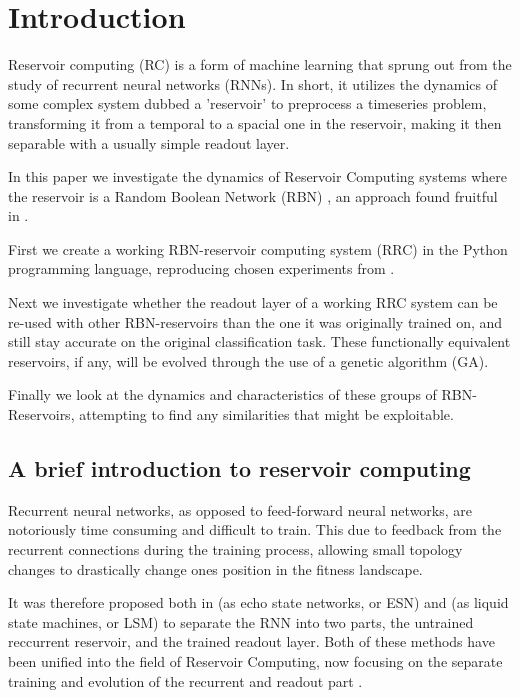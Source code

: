 \section{Introduction}

Reservoir computing (RC) is a form of machine learning that sprung out from the study of recurrent neural networks (RNNs).
In short, it utilizes the dynamics of some complex system dubbed a 'reservoir' to preprocess a timeseries problem,
transforming it from a temporal to a spacial one in the reservoir, making it then separable with a usually simple readout layer.

In this paper we investigate the dynamics of Reservoir Computing systems where the reservoir is a Random Boolean Network (RBN) \cite{gershenson2004introduction},
an approach found fruitful in \cite{rbn-reservoir}.

First we create a working RBN-reservoir computing system (RRC) in the Python programming language,
reproducing chosen experiments from \cite{rbn-reservoir}.

Next we investigate whether the readout layer of a working RRC system can be re-used with other RBN-reservoirs than the one it was originally trained on,
and still stay accurate on the original classification task.
These functionally equivalent reservoirs, if any, will be evolved through the use of a genetic algorithm (GA).

Finally we look at the dynamics and characteristics of these groups of RBN-Reservoirs, attempting to find any similarities that might be exploitable.


\subsection{A brief introduction to reservoir computing}

Recurrent neural networks, as opposed to feed-forward neural networks,
are notoriously time consuming and difficult to train.
This due to feedback from the recurrent connections during the training process,
allowing small topology changes to drastically change ones position in the fitness landscape.

It was therefore proposed both in \cite{jaeger2002adaptive} (as echo state networks, or ESN)
and \cite{natschlager2002liquid} (as liquid state machines, or LSM) to separate the RNN into two parts,
the untrained reccurrent reservoir, and the trained readout layer.
Both of these methods have been unified into the field of Reservoir Computing,
now focusing on the separate training and evolution of the recurrent and readout part \cite{lukovsevivcius2012reservoir}.

